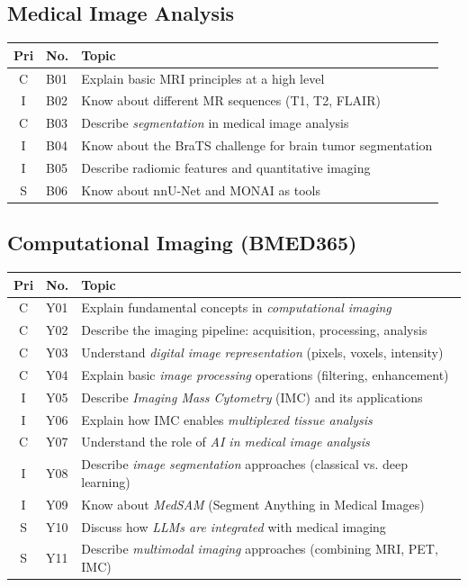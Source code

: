 \documentclass[11pt,a4paper]{article}
\begin{document}
\subsection{Medical Image Analysis}

\begin{longtable}{@{}clp{9cm}@{}}
\toprule
\textbf{Pri} & \textbf{No.} & \textbf{Topic} \\
\midrule
\endfirsthead
\midrule
\endhead
\midrule
\endfoot
\bottomrule
\endlastfoot
C & B01 & Explain basic MRI principles at a high level \\
I & B02 & Know about different MR sequences (T1, T2, FLAIR) \\
C & B03 & Describe \emph{segmentation} in medical image analysis \\
I & B04 & Know about the BraTS challenge for brain tumor segmentation \\
I & B05 & Describe radiomic features and quantitative imaging \\
S & B06 & Know about nnU-Net and MONAI as tools \\
\end{longtable}

\subsection{Computational Imaging (BMED365)}

\begin{longtable}{@{}clp{9cm}@{}}
\toprule
\textbf{Pri} & \textbf{No.} & \textbf{Topic} \\
\midrule
\endfirsthead
\midrule
\endhead
\midrule
\endfoot
\bottomrule
\endlastfoot
C & Y01 & Explain fundamental concepts in \emph{computational imaging} \\
C & Y02 & Describe the imaging pipeline: acquisition, processing, analysis \\
C & Y03 & Understand \emph{digital image representation} (pixels, voxels, intensity) \\
C & Y04 & Explain basic \emph{image processing} operations (filtering, enhancement) \\
I & Y05 & Describe \emph{Imaging Mass Cytometry} (IMC) and its applications \\
I & Y06 & Explain how IMC enables \emph{multiplexed tissue analysis} \\
C & Y07 & Understand the role of \emph{AI in medical image analysis} \\
I & Y08 & Describe \emph{image segmentation} approaches (classical vs. deep learning) \\
I & Y09 & Know about \emph{MedSAM} (Segment Anything in Medical Images) \\
S & Y10 & Discuss how \emph{LLMs are integrated} with medical imaging \\
S & Y11 & Describe \emph{multimodal imaging} approaches (combining MRI, PET, IMC) \\
\end{longtable}
\end{document}
